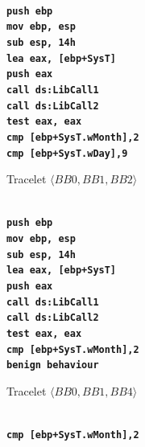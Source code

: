 \begin{figure}[!h]
\scriptsize
  \begin{subfigure}[b]{0.5\linewidth}
    \centering
    \raggedright{\textbf{\texttt{
    \\
    	push ebp\\
    	mov	ebp, esp\\
   		sub	esp, 14h\\
   		lea eax, [ebp+SysT]\\
   		push eax\\
   		call ds:LibCall1\\
   		call ds:LibCall2\\
   		test eax, eax\\
   		cmp [ebp+SysT.wMonth],2\\
   		cmp [ebp+SysT.wDay],9\\
    }}}
    \caption{\small{Tracelet $\langle BB0, BB1, BB2\rangle$}}
   \label{fig:traceleta}
    \vspace{4ex}
  \end{subfigure}%
  \begin{subfigure}[b]{0.5\linewidth}
    \centering
      \raggedright{\textbf{\texttt{
    \\
    	push ebp\\
    	mov	ebp, esp\\
   		sub	esp, 14h\\
   		lea eax, [ebp+SysT]\\
   		push eax\\
   		call ds:LibCall1\\
   		call ds:LibCall2\\
   		test eax, eax\\
   		cmp [ebp+SysT.wMonth],2\\
   		benign behaviour
    }}}
    \caption{\small{Tracelet $\langle BB0, BB1, BB4\rangle$}}
    \label{fig:traceletb}
    \vspace{4ex}
  \end{subfigure}
  \begin{subfigure}[b]{0.5\linewidth}
    \centering
    \raggedright{\textbf{\texttt{
    \\
   		cmp [ebp+SysT.wMonth],2\\
}}}
\end{subfigure}
\end{figure}
